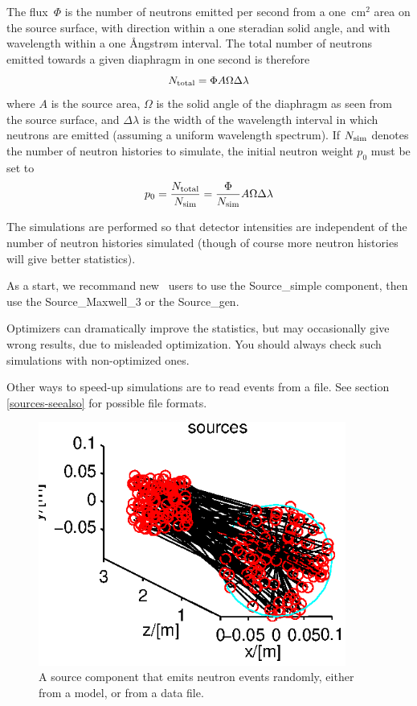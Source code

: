 The flux~$\Phi$ is the number of neutrons emitted per second from a
one~cm$^2$ area on the source surface, with direction within a one
steradian solid angle, and with wavelength within a one {\AA}ngstr{\o}m
interval. The total number of neutrons emitted towards a given diaphragm
in one second is therefore
$$ N_{\rm total} = \Phi A \Omega \Delta\lambda $$
where $A$ is the source area, $\Omega$ is the solid angle of the
diaphragm as seen from the source surface, and $\Delta\lambda$ is the
width of the wavelength interval in which neutrons are emitted (assuming
a uniform wavelength spectrum). If $N_{\rm sim}$ denotes the number of
neutron histories to simulate, the initial neutron weight $p_0$ must be set to
$$ p_0 = \frac{N_{\rm total}}{N_{\rm sim}} =
    \frac{\Phi}{N_{\rm sim}} A \Omega \Delta\lambda $$

The simulations are performed so that detector intensities
are independent of the number of neutron histories simulated
(though of course more neutron histories will give better statistics).

As a start, we recommand new \MCS\ users to use the Source\_simple component, then use the Source\_Maxwell\_3 or the Source\_gen.

Optimizers can dramatically improve the statistics, but may occasionally give wrong results, due to misleaded optimization. You should always check such simulations with non-optimized ones.

Other ways to speed-up simulations are to read events from a file. See section \ref{sources-seealso} for possible file formats.

\begin{figure}
  \begin{center}
    \includegraphics[width=0.9\textwidth]{figures/sources.eps}
  \end{center}
\caption{A source component that emits neutron events randomly, either from a model, or from a data file.}
\label{f:source}
\end{figure}

